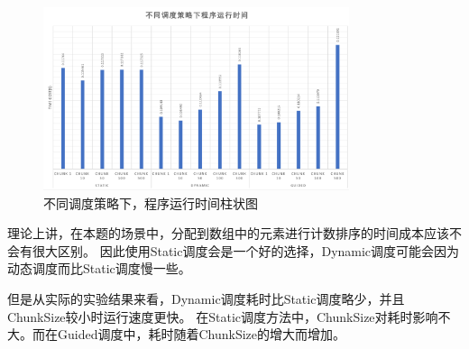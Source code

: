 \documentclass[UTF8]{article}
\begin{document}
\begin{figure}[h]
    \label{Ratio}
    \centering
        \includegraphics[width=0.8\textwidth]{st.png}
        \caption{不同调度策略下，程序运行时间柱状图}
    \end{figure}
理论上讲，在本题的场景中，分配到数组中的元素进行计数排序的时间成本应该不会有很大区别。
因此使用Static调度会是一个好的选择，Dynamic调度可能会因为动态调度而比Static调度慢一些。

但是从实际的实验结果来看，Dynamic调度耗时比Static调度略少，并且ChunkSize较小时运行速度更快。
在Static调度方法中，ChunkSize对耗时影响不大。而在Guided调度中，耗时随着ChunkSize的增大而增加。



\end{document}

